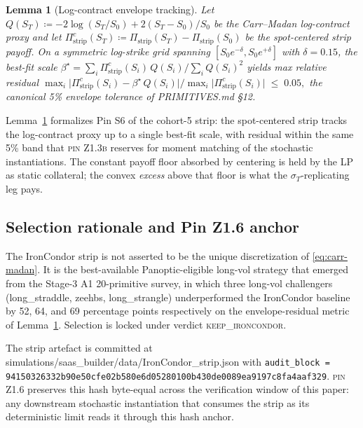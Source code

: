 \documentclass[11pt,letterpaper]{article}
\newtheorem{lemma}{Lemma}[section]
\newcommand{\sigmaT}{\sigma_{T}}
\newcommand{\PinZ}[1]{\textsc{pin Z1.#1}}
\begin{document}
\begin{lemma}[Log-contract envelope tracking]
\label{lem:envelope}
Let $Q(S_{T}) \coloneqq -2\log(S_{T}/S_{0}) + 2(S_{T} - S_{0})/S_{0}$ be
the Carr--Madan log-contract proxy and let
$\Pi_{\text{strip}}^{c}(S_{T}) \coloneqq \Pi_{\text{strip}}(S_{T}) -
\Pi_{\text{strip}}(S_{0})$ be the spot-centered strip payoff. On a symmetric
log-strike grid spanning $[S_{0} e^{-\delta}, S_{0} e^{+\delta}]$ with
$\delta = 0.15$, the best-fit scale $\beta^{\star} =
\sum_{i} \Pi_{\text{strip}}^{c}(S_{i})\,Q(S_{i})\big/\sum_{i} Q(S_{i})^{2}$
yields max relative residual
\(
    \max_{i} \bigl|\Pi_{\text{strip}}^{c}(S_{i})
                     - \beta^{\star}\,Q(S_{i})\bigr| \big/
    \max_{i} \bigl|\Pi_{\text{strip}}^{c}(S_{i})\bigr|
    \;\leq\;
    0.05,
\)
the canonical 5\% envelope tolerance of \textsf{PRIMITIVES.md} \S12.
\end{lemma}

Lemma~\ref{lem:envelope} formalizes Pin S6 of the cohort-5 strip:
the spot-centered strip tracks the log-contract proxy up to a single
best-fit scale, with residual within the same 5\% band that
\PinZ{3b} reserves for moment matching of the stochastic instantiations.
The constant payoff floor absorbed by centering is held by the LP as
static collateral; the convex \emph{excess} above that floor is what the
$\sigmaT$-replicating leg pays.

\subsection{Selection rationale and Pin Z1.6 anchor}
\label{sec:det:selection}

The IronCondor strip is not asserted to be the unique discretization of
\eqref{eq:carr-madan}. It is the best-available Panoptic-eligible
long-vol strategy that emerged from the Stage-3 A1 20-primitive survey,
in which three long-vol challengers (\textsf{long\_straddle},
\textsf{zeehbs}, \textsf{long\_strangle}) underperformed the IronCondor
baseline by 52, 64, and 69 percentage points respectively on the
envelope-residual metric of Lemma~\ref{lem:envelope}. Selection is
locked under verdict \textsc{keep\_ironcondor}.

The strip artefact is committed at
\textsf{simulations/saas\_builder/data/IronCondor\_strip.json} with
\texttt{audit\_block = 94150326332b90e50cfe02b580e6d05280100b430de0089ea9197c8fa4aaf329}.
\PinZ{6} preserves this hash byte-equal across the verification window
of this paper: any downstream stochastic instantiation that consumes the
strip as its deterministic limit reads it through this hash anchor.
\end{document}
